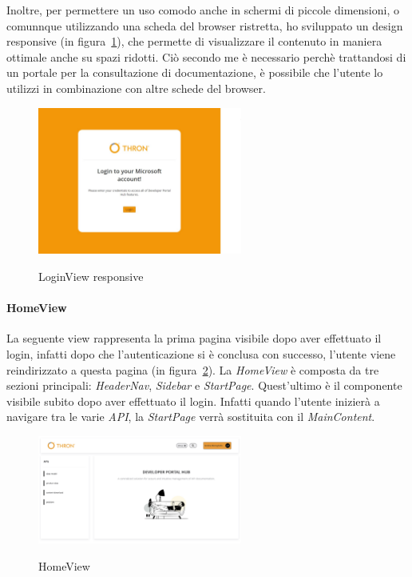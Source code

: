 Inoltre, per permettere un uso comodo anche in schermi di piccole dimensioni, o comunnque utilizzando una scheda del browser ristretta, ho sviluppato
un design responsive (in figura~\ref{fig:login-view-responsive}), che permette di visualizzare il contenuto in maniera ottimale anche su spazi ridotti.
Ciò secondo me è necessario perchè trattandosi di un portale per la consultazione di documentazione, è possibile che l'utente 
lo utilizzi in combinazione con altre schede del browser.

\begin{figure}[ht]
  \centering
  \includegraphics[width=0.6\textwidth, alt={Pagina di login responsive dell'applicazione}]{images/frontend/LoginViewRes.jpg}
  \caption{LoginView responsive}\label{fig:login-view-responsive}
\end{figure}


\paragraph{HomeView}\label{par:home-view}
La seguente view rappresenta la prima pagina visibile dopo aver effettuato il login, infatti dopo che l'autenticazione si è conclusa con successo, 
l'utente viene reindirizzato a questa pagina (in figura~\ref{fig:home-view}).
La \textit{HomeView} è composta da tre sezioni principali: \textit{HeaderNav}, \textit{Sidebar} e \textit{StartPage}. Quest'ultimo è il componente visibile 
subito dopo aver effettuato il login. Infatti quando l'utente inizierà a navigare tra le varie \textit{API}, la \textit{StartPage} verrà sostituita con il \textit{MainContent}.

\begin{figure}[ht]
  \centering
  \includegraphics[width=0.6\textwidth, alt={Pagina principale dell'applicazione}]{images/frontend/HomeView.jpg}
  \caption{HomeView}\label{fig:home-view}
\end{figure}
\pagebreak

